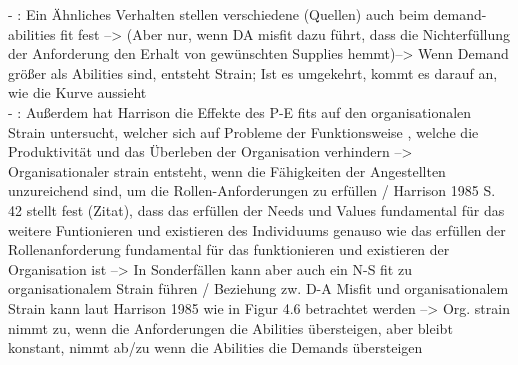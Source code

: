 - \cite[S. 22f.]{edwards:2008}: Ein Ähnliches Verhalten stellen verschiedene (Quellen) auch beim demand-abilities fit fest --> (Aber nur, wenn DA misfit dazu führt, dass die Nichterfüllung der Anforderung den Erhalt von gewünschten Supplies hemmt)--> Wenn Demand größer als Abilities sind, entsteht Strain; Ist es umgekehrt, kommt es darauf an, wie die Kurve aussieht \\
- \cite[S. 24]{edwards:2008}: Außerdem hat Harrison die Effekte des P-E fits auf den organisationalen Strain untersucht, welcher sich auf Probleme der Funktionsweise , welche die Produktivität und das Überleben der Organisation verhindern --> Organisationaler strain entsteht, wenn die Fähigkeiten der Angestellten unzureichend sind, um die Rollen-Anforderungen zu erfüllen / Harrison 1985 S. 42 stellt fest (Zitat), dass das erfüllen der Needs und Values fundamental für das weitere Funtionieren und existieren des Individuums genauso wie das erfüllen der Rollenanforderung fundamental für das funktionieren und existieren der Organisation ist --> In Sonderfällen kann aber auch ein N-S fit zu organisationalem Strain führen / Beziehung zw. D-A Misfit und organisationalem Strain kann laut Harrison 1985 wie in Figur 4.6 betrachtet werden --> Org. strain nimmt zu, wenn die Anforderungen die Abilities übersteigen, aber bleibt konstant, nimmt ab/zu wenn die Abilities die Demands übersteigen \\

